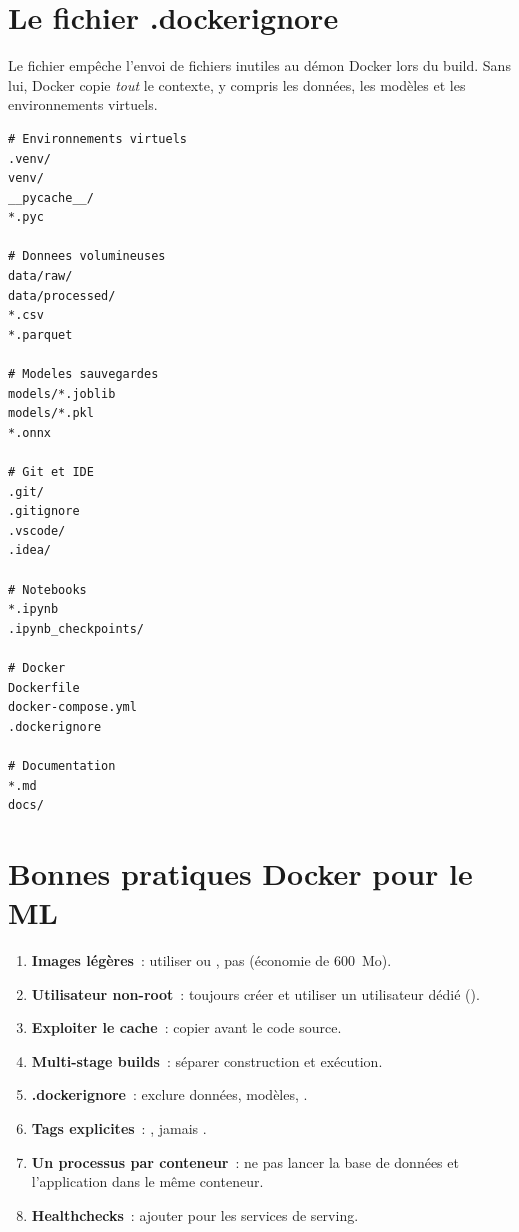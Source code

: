 \section{Le fichier .dockerignore}
\label{sec:dockerignore}

Le fichier  emp\^eche l'envoi de fichiers inutiles
au d\'emon Docker lors du build. Sans lui, Docker copie \emph{tout} le
contexte, y compris les donn\'ees, les mod\`eles et les environnements
virtuels.

\begin{codeblock}[title=\textbf{.dockerignore pour projet ML}]
\begin{verbatim}
# Environnements virtuels
.venv/
venv/
__pycache__/
*.pyc

# Donnees volumineuses
data/raw/
data/processed/
*.csv
*.parquet

# Modeles sauvegardes
models/*.joblib
models/*.pkl
*.onnx

# Git et IDE
.git/
.gitignore
.vscode/
.idea/

# Notebooks
*.ipynb
.ipynb_checkpoints/

# Docker
Dockerfile
docker-compose.yml
.dockerignore

# Documentation
*.md
docs/
\end{verbatim}
\end{codeblock}

\section{Bonnes pratiques Docker pour le ML}
\label{sec:docker-best-practices}

\begin{bonnepratique}[title=\textbf{R\`egles d'or Docker en ML}]
\begin{enumerate}
  \item \textbf{Images l\'eg\`eres}~: utiliser  ou
    , pas  (\'economie de 600~Mo).
  \item \textbf{Utilisateur non-root}~: toujours cr\'eer et utiliser un
    utilisateur d\'edi\'e ().
  \item \textbf{Exploiter le cache}~: copier  avant
    le code source.
  \item \textbf{Multi-stage builds}~: s\'eparer construction et ex\'ecution.
  \item \textbf{.dockerignore}~: exclure donn\'ees, mod\`eles, .
  \item \textbf{Tags explicites}~: , jamais
    .
  \item \textbf{Un processus par conteneur}~: ne pas lancer la base de
    donn\'ees et l'application dans le m\^eme conteneur.
  \item \textbf{Healthchecks}~: ajouter  pour les services
    de serving.
\end{enumerate}
\end{bonnepratique}

